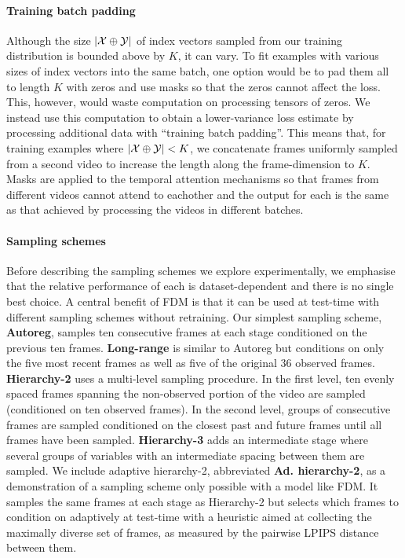 \paragraph{Training batch padding}
Although the size $|\mathcal{X}\oplus\mathcal{Y}|$ of index vectors sampled from our training distribution is bounded above by $K$, it can vary. To fit examples with various sizes of index vectors into the same batch, one option would be to pad them all to length $K$ with zeros and use masks so that the zeros cannot affect the loss. This, however, would waste computation on processing tensors of zeros.
%
We instead use this computation to obtain a lower-variance loss estimate by processing additional data with ``training batch padding''.
%
This means that, for training examples where $|\mathcal{X}\oplus\mathcal{Y}| < K$, we concatenate frames uniformly sampled from a second video to increase the length along the frame-dimension to $K$. Masks are applied to the temporal attention mechanisms so that frames from different videos cannot attend to eachother and the output for each is the same as that achieved by processing the videos in different batches.

\paragraph{Sampling schemes}
Before describing the sampling schemes we explore experimentally, we emphasise that the relative performance of each is dataset-dependent and there is no single best choice. A central benefit of FDM is that it can be used at test-time with different sampling schemes without retraining. Our simplest sampling scheme, \textbf{Autoreg}, samples ten consecutive frames at each stage conditioned on the previous ten frames. \textbf{Long-range} is similar to Autoreg but conditions on only the five most recent frames as well as five of the original 36 observed frames. \textbf{Hierarchy-2} uses a multi-level sampling procedure. In the first level, ten evenly spaced frames spanning the non-observed portion of the video are sampled (conditioned on ten observed frames). In the second level, groups of consecutive frames are sampled conditioned on the closest past and future frames until all frames have been sampled. \textbf{Hierarchy-3} adds an intermediate stage where several groups of variables with an intermediate spacing between them are sampled. We include adaptive hierarchy-2, abbreviated \textbf{Ad. hierarchy-2}, as a demonstration of a sampling scheme only possible with a model like FDM. It samples the same frames at each stage as Hierarchy-2 but selects which frames to condition on adaptively at test-time with a heuristic aimed at collecting the maximally diverse set of frames, as measured by the pairwise LPIPS distance~\cite{zhang2018unreasonable} between them.

